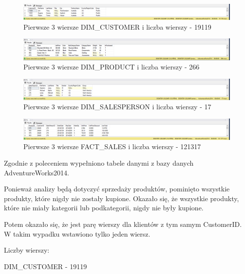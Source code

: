 \documentclass[a4paper,12pt]{article}
\begin{document}
\begin{figure}[H]
    \centering
    \includegraphics[width=1.0\textwidth]{images/3_customers.png}
    \caption{Pierwsze 3 wiersze DIM\_CUSTOMER i liczba wierszy - 19119}
\end{figure}

\begin{figure}[H]
    \centering
    \includegraphics[width=1.0\textwidth]{images/3_products.png}
    \caption{Pierwsze 3 wiersze DIM\_PRODUCT i liczba wierszy - 266}
\end{figure}

\begin{figure}[H]
    \centering
    \includegraphics[width=1.0\textwidth]{images/3_sale_people.png}
    \caption{Pierwsze 3 wiersze DIM\_SALESPERSON i liczba wierszy - 17}
\end{figure}

\begin{figure}[H]
    \centering
    \includegraphics[width=1.0\textwidth]{images/3_sales.png}
    \caption{Pierwsze 3 wiersze FACT\_SALES i liczba wierszy - 121317}
\end{figure}

Zgodnie z poleceniem wypełniono tabele danymi z bazy danych AdventureWorks2014.

Ponieważ analizy będą dotyczyć sprzedaży produktów, pominięto wszystkie produkty, które nigdy nie zostały kupione. Okazało się, że wszystkie produkty, które nie miały kategorii lub podkategorii, nigdy nie były kupione.

Potem okazało się, że jest parę wierszy dla klientów z tym samym CustomerID. W takim wypadku wstawiono tylko jeden wiersz.

Liczby wierszy:

DIM\_CUSTOMER - 19119
\end{document}
